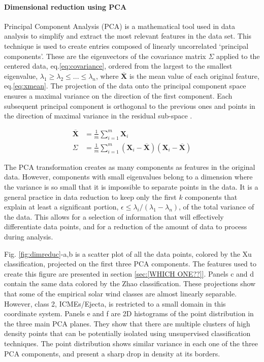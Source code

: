 \paragraph{Dimensional reduction using PCA}
Principal Component Analysis (PCA) is a mathematical tool used in data analysis to simplify and extract the most relevant features in the data set. This technique is used to create entries composed of linearly uncorrelated `principal components'. These are the eigenvectors of the covariance matrix $\Sigma$ applied to the centered data, eq.\eqref{eq:covariance}, ordered from the largest to the smallest eigenvalue, $\lambda_1 \ge \lambda_2 \le ... \le \lambda_n$, where $\overline{\boldsymbol{X}}$ is the mean value of each original feature, eq.\eqref{eq:xmean}. The projection of the data onto the principal component space ensures a maximal variance on the direction of the first component. Each subsequent principal component is orthogonal to the previous ones and points in the direction of maximal variance in the residual sub-space \citep{Shlens2014}.

\begin{align}
\overline{\boldsymbol{X}} & = \frac{1}{m} \sum_{i=1}^{m} \boldsymbol{X}_i \label{eq:xmean} \\
\Sigma & = \frac{1}{m} \sum_{i=1}^{m} \left( \boldsymbol{X}_i - \overline{\boldsymbol{X}} \right)\left( \boldsymbol{X}_i - \overline{\boldsymbol{X}} \right) \label{eq:covariance}
\end{align}

The PCA transformation creates as many components as features in the original data. However, components with small eigenvalues belong to a dimension where the variance is so small that it is impossible to separate points in the data. It is a general practice in data reduction to keep only the first $k$ components that explain at least a significant portion, $\epsilon \le \lambda_i/(\lambda_1 - \lambda_n)$, of the total variance of the data. This allows for a selection of information that will effectively differentiate data points, and for a reduction of the amount of data to process during analysis.

Fig. \ref{fig:dimreduc}-a,b is a scatter plot of all the data points, colored by the Xu classification, projected on the first three PCA components. The features used to create this figure are presented in section \ref{sec:[WHICH ONE??]}. Panels c and d contain the same data colored by the Zhao classification. These projections show that some of the empirical solar wind classes are almost linearly separable. However, class 2, ICMEs/Ejecta, is restricted to a small domain in this coordinate system. Panels e and f are 2D histograms of the point distribution in the three main PCA planes. They show that there are multiple clusters of high density points that can be potentially isolated using unsupervised classification techniques. The point distribution shows similar variance in each one of the three PCA components, and present a sharp drop in density at its borders.

